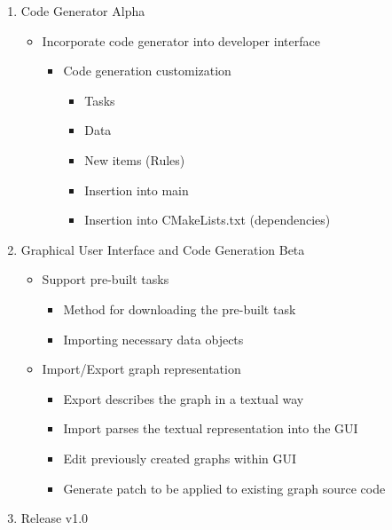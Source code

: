 \documentclass[]{article}
\begin{document}
\begin{enumerate}
\begin{itemize}
\begin{itemize}
\begin{itemize}
	  	\end{itemize}
	  \end{itemize}
  	\end{itemize}
  \item Code Generator Alpha
  	\begin{itemize}
  	\item Incorporate code generator into developer interface 
		\begin{itemize}
		\item Code generation customization
  		  \begin{itemize}
  		  \item Tasks
		  \item Data
		  \item New items (Rules)
		  \item Insertion into main
		  \item Insertion into CMakeLists.txt (dependencies)
		  \end{itemize}		
		\end{itemize}
  	\end{itemize}		
  \item Graphical User Interface and Code Generation Beta
    \begin{itemize}
    \item Support pre-built tasks
      \begin{itemize}
      \item Method for downloading the pre-built task
      \item Importing necessary data objects
      \end{itemize}
    \item Import/Export graph representation
      \begin{itemize}
      \item Export describes the graph in a textual way
      \item Import parses the textual representation into the GUI
	  \item Edit previously created graphs within GUI
	  \item Generate patch to be applied to existing graph source code	
      \end{itemize}  
    \end{itemize}
  \item Release v1.0

\end{enumerate}



\end{document}
